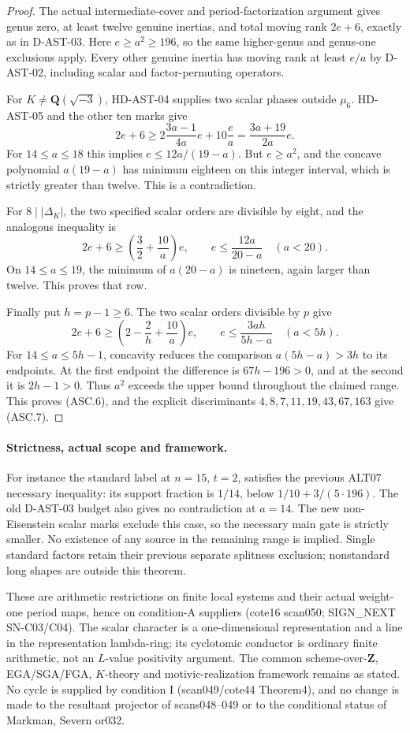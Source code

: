 \begin{proof}
The actual intermediate-cover and period-factorization argument gives
genus zero, at least twelve genuine inertias, and total moving rank
$2e+6$, exactly as in D-AST-03. Here $e\ge a^2\ge196$,
so the same higher-genus and genus-one exclusions apply.
Every other genuine inertia has moving rank at least $e/a$ by
D-AST-02, including scalar and factor-permuting operators.

For $K\ne\mathbf Q(\sqrt{-3})$, HD-AST-04 supplies two
scalar phases outside $\mu_6$. HD-AST-05 and the other ten marks give
\[
  2e+6\ge2\frac{3a-1}{4a}e+10\frac ea
          =\frac{3a+19}{2a}e.
 \tag{ASC.8}
\]
For $14\le a\le18$ this implies
$e\le12a/(19-a)$. But $e\ge a^2$, and the concave polynomial
$a(19-a)$ has minimum eighteen on this integer interval, which
is strictly greater than twelve. This is a contradiction.

For $8\mid|\Delta_K|$, the two specified scalar orders are divisible
by eight, and the analogous inequality is
\[
       2e+6\ge\left(\frac32+\frac{10}{a}\right)e,
       \qquad e\le\frac{12a}{20-a}\quad(a<20).
 \tag{ASC.9}
\]
On $14\le a\le19$, the minimum of $a(20-a)$ is nineteen,
again larger than twelve. This proves that row.

Finally put $h=p-1\ge6$. The two scalar orders divisible by $p$
give
\[
 2e+6\ge\left(2-\frac2h+\frac{10}{a}\right)e,
 \qquad e\le\frac{3ah}{5h-a}\quad(a<5h).
 \tag{ASC.10}
\]
For $14\le a\le5h-1$, concavity reduces the comparison
$a(5h-a)>3h$ to its endpoints. At the first endpoint the
difference is $67h-196>0$, and at the second it is
$2h-1>0$. Thus $a^2$ exceeds the upper bound throughout the
claimed range. This proves (ASC.6), and the explicit discriminants
$4,8,7,11,19,43,67,163$ give (ASC.7).
\end{proof}

\paragraph{Strictness, actual scope and framework.}
For instance the standard label at $n=15$, $t=2$, satisfies the
previous ALT07 necessary inequality: its support fraction is $1/14$,
below $1/10+3/(5\cdot196)$. The old D-AST-03 budget also
gives no contradiction at $a=14$. The new non-Eisenstein scalar
marks exclude this case, so the necessary main gate is strictly
smaller. No existence of any source in the remaining range is implied.
Single standard factors retain their previous separate splitness
exclusion; nonstandard long shapes are outside this theorem.

These are arithmetic restrictions on finite local systems and their
actual weight-one period maps, hence on condition-A suppliers
(cote16 scan050; SIGN\_NEXT SN-C03/C04). The scalar character is
a one-dimensional representation and a line in the representation
lambda-ring; its cyclotomic conductor is ordinary finite arithmetic,
not an $L$-value positivity argument. The common scheme-over-$\mathbf Z$,
EGA/SGA/FGA, $K$-theory and motivic-realization framework remains
as stated. No cycle is supplied by condition I (scan049/cote44
Theorem4), and no change is made to the resultant projector of
scans048--049 or to the conditional status of Markman, Severn or032.
